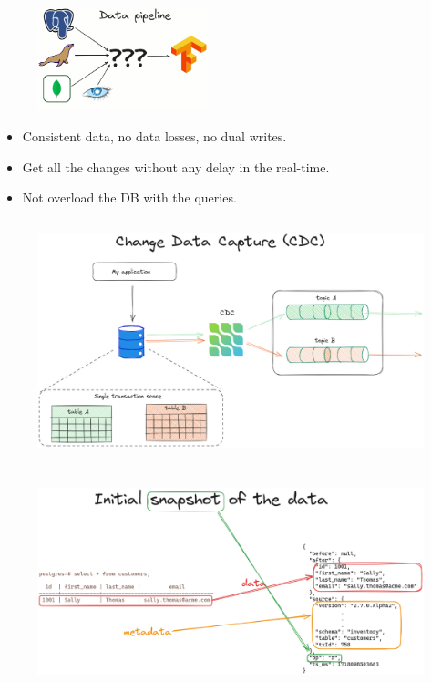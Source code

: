 \documentclass[10pt,utf8]{beamer}
\begin{document}
\begin{frame}
    \begin{figure}
        \centering
        \includegraphics[height=3cm]{./img/dbs_to_tf2.eps}
    \end{figure}
    \begin{itemize}
      \item Consistent data, no data losses, no dual writes.
      \item Get all the changes without any delay in the real-time.
      \item Not overload the DB with the queries.
    \end{itemize}
\end{frame}

\begin{frame}
    \begin{figure}
        \centering
        \includegraphics[height=7cm]{./img/cdc.eps}
    \end{figure}
\end{frame}

\begin{frame}
    \begin{figure}
        \centering
        \includegraphics[height=6cm]{./img/initial_snapshot_data.eps}
    \end{figure}
\end{frame}
\end{document}
